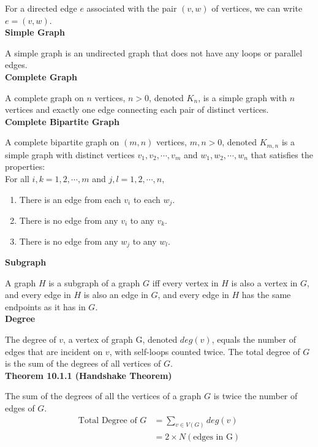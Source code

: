 \documentclass[a4paper]{article}
\newcommand{\subheading}[1]{{\scriptsize\textbf{#1}}}
\begin{document}
\begin{multicols*}{4}
For a directed edge $e$ associated with the pair $(v, w)$ of vertices, we can
write $e = (v, w)$.\\

\subheading{Simple Graph}

A simple graph is an undirected graph that does not have any loops or parallel
edges.\\

\subheading{Complete Graph}

A complete graph on $n$ vertices, $n > 0$, denoted $K_n$, is a simple graph with
$n$ vertices and exactly one edge connecting each pair of distinct vertices.\\

\subheading{Complete Bipartite Graph}

A complete bipartite graph on $(m, n)$ vertices, $m, n > 0$, denoted $K_{m,n}$
is a simple graph with distinct vertices $v_1, v_2, \cdots, v_m$ and $w_1, w_2,
\cdots, w_n$ that satisfies the properties:\\

For all $i, k = 1, 2, \cdots, m$ and $j, l = 1, 2, \cdots, n$,
\begin{enumerate} \itemsep -0.5em
  \item There is an edge from each $v_i$ to each $w_j$.
  \item There is no edge from any $v_i$ to any $v_k$.
  \item There is no edge from any $w_j$ to any $w_l$.
\end{enumerate}

\subheading{Subgraph}

A graph $H$ is a subgraph of a graph $G$ iff every vertex in $H$ is also a
vertex in $G$, and every edge in $H$ is also an edge in $G$, and every edge in
$H$ has the same endpoints as it has in $G$.\\

\subheading{Degree}

The degree of $v$, a vertex of graph G, denoted $deg(v)$, equals the number of
edges that are incident on $v$, with self-loops counted twice. The total degree
of $G$ is the sum of the degrees of all vertices of $G$.\\

\subheading{Theorem 10.1.1 (Handshake Theorem)}

The sum of the degrees of all the vertices of a graph $G$ is twice the number of
edges of $G$.
\begin{align*}
  \text{Total Degree of $G$} &= \sum_{v \in V(G)} deg(v) \\
     &= 2 \times N(\text{edges in G})
\end{align*}


\end{multicols*}
\end{document}
